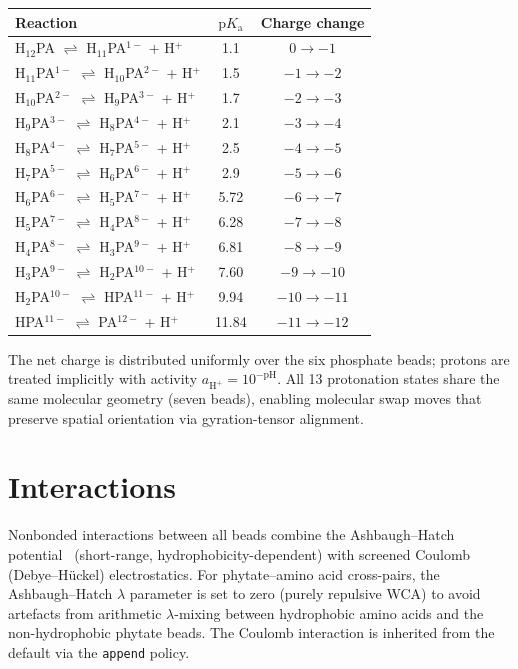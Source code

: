 \documentclass[11pt]{article}
\begin{document}
\begin{table}[h]
\centering
\begin{tabular}{@{}lcc@{}}
\toprule
Reaction & $\text{p}K_\text{a}$ & Charge change \\
\midrule
H$_{12}$PA       $\rightleftharpoons$ H$_{11}$PA$^{1-}$  + H$^+$ & 1.1   & $0 \to -1$   \\
H$_{11}$PA$^{1-}$ $\rightleftharpoons$ H$_{10}$PA$^{2-}$ + H$^+$ & 1.5   & $-1 \to -2$  \\
H$_{10}$PA$^{2-}$ $\rightleftharpoons$ H$_9$PA$^{3-}$    + H$^+$ & 1.7   & $-2 \to -3$  \\
H$_9$PA$^{3-}$   $\rightleftharpoons$ H$_8$PA$^{4-}$     + H$^+$ & 2.1   & $-3 \to -4$  \\
H$_8$PA$^{4-}$   $\rightleftharpoons$ H$_7$PA$^{5-}$     + H$^+$ & 2.5   & $-4 \to -5$  \\
H$_7$PA$^{5-}$   $\rightleftharpoons$ H$_6$PA$^{6-}$     + H$^+$ & 2.9   & $-5 \to -6$  \\
H$_6$PA$^{6-}$   $\rightleftharpoons$ H$_5$PA$^{7-}$     + H$^+$ & 5.72  & $-6 \to -7$  \\
H$_5$PA$^{7-}$   $\rightleftharpoons$ H$_4$PA$^{8-}$     + H$^+$ & 6.28  & $-7 \to -8$  \\
H$_4$PA$^{8-}$   $\rightleftharpoons$ H$_3$PA$^{9-}$     + H$^+$ & 6.81  & $-8 \to -9$  \\
H$_3$PA$^{9-}$   $\rightleftharpoons$ H$_2$PA$^{10-}$    + H$^+$ & 7.60  & $-9 \to -10$ \\
H$_2$PA$^{10-}$  $\rightleftharpoons$ HPA$^{11-}$        + H$^+$ & 9.94  & $-10 \to -11$ \\
HPA$^{11-}$      $\rightleftharpoons$ PA$^{12-}$         + H$^+$ & 11.84 & $-11 \to -12$ \\
\bottomrule
\end{tabular}
\end{table}

\noindent
The net charge is distributed uniformly over the six phosphate beads;
protons are treated implicitly with activity $a_{\text{H}^+} =
10^{-\text{pH}}$.  All 13 protonation states share the same molecular
geometry (seven beads), enabling molecular swap moves that preserve
spatial orientation via gyration-tensor alignment.

\section{Interactions}

Nonbonded interactions between all beads combine the Ashbaugh--Hatch
potential~\cite{Ashbaugh2008} (short-range, hydrophobicity-dependent)
with screened Coulomb (Debye--H\"uckel) electrostatics.
For phytate--amino acid cross-pairs, the Ashbaugh--Hatch
$\lambda$ parameter is set to zero (purely repulsive WCA) to avoid
artefacts from arithmetic $\lambda$-mixing between hydrophobic amino
acids and the non-hydrophobic phytate beads.  The Coulomb interaction
is inherited from the default via the \texttt{append} policy.
\end{document}
